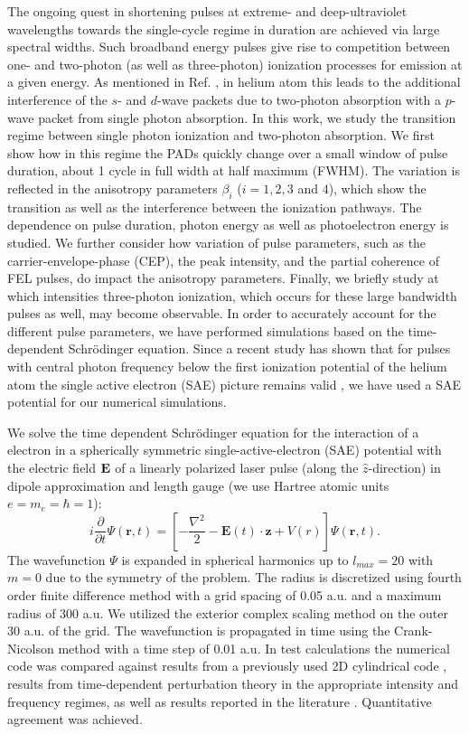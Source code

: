 The ongoing quest in shortening pulses at extreme- and deep-ultraviolet wavelengths towards the single-cycle regime in duration are achieved via large spectral widths. Such broadband energy pulses give rise to competition between one- and two-photon (as well as three-photon) ionization processes for emission at a given energy. As mentioned in Ref. \cite{boll2019}, in helium atom this leads to the additional interference of the $s$- and $d$-wave packets due to two-photon absorption with a $p$-wave packet from single photon absorption. In this work, we study the transition regime between single photon ionization and two-photon absorption. We first show how in this regime the PADs quickly change over a small window of pulse duration, about 1 cycle in full width at half maximum (FWHM). The variation is reflected in the anisotropy parameters $\beta_i$ ($i = 1, 2, 3$ and $4$), which show the transition as well as the interference between the ionization pathways. The dependence on pulse duration, photon energy as well as photoelectron energy is studied. We further consider how variation of pulse parameters, such as the carrier-envelope-phase (CEP), the peak intensity, and the partial coherence of FEL pulses, do impact the anisotropy parameters. Finally, we briefly study at which intensities three-photon ionization, which occurs for these large bandwidth pulses as well, may become observable. In order to accurately account for the different pulse parameters, we have performed simulations based on the time-dependent Schr\"odinger equation. 
Since a recent study has shown that for pulses with central photon frequency below the first ionization potential of the helium atom the single active electron (SAE) picture remains valid \cite{boll2019}, we have used a SAE potential for our numerical simulations. 

We solve the time dependent Schr\"odinger equation for the interaction of a electron in a spherically symmetric single-active-electron (SAE) potential with the electric field ${\bf E}$ of a linearly polarized laser pulse (along the ${\hat z}$-direction) in dipole approximation and length gauge (we use Hartree atomic units $e = m_e = \hbar =1$): 
%
\begin{equation}
i\frac{\partial}{\partial t}\Psi(\mathbf{r},t) = \left[-\frac{\nabla^2}{2} - \mathbf{E}(t) \cdot \mathbf{z} + V(r)\right]\Psi(\mathbf{r},t).
\end{equation}
%
The wavefunction $\Psi$ is expanded in spherical harmonics up to $l_{max} = 20$ with $m=0$ due to the symmetry of the problem. The radius is discretized using fourth order finite difference method with a grid spacing of 0.05 a.u. and a maximum radius of 300 a.u. We utilized the exterior complex scaling method on the outer 30 a.u. of the grid. The wavefunction is propagated in time using the Crank-Nicolson method with a time step of 0.01 a.u. In test calculations the numerical code was compared against results from a previously used 2D cylindrical code \cite{venzke2018_ryd}, results from time-dependent perturbation theory in the appropriate intensity and frequency regimes, as well as results reported in the literature \cite{scrinzi2010}. Quantitative agreement was achieved.

